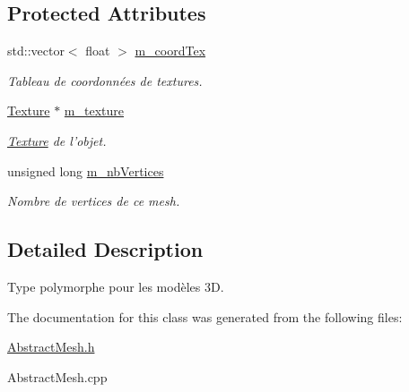 \subsection*{Protected Attributes}
\begin{DoxyCompactItemize}
\item 
\hypertarget{classAbstractMesh_a15e43124d601085e1495c738a657c826}{std\+::vector$<$ float $>$ \hyperlink{classAbstractMesh_a15e43124d601085e1495c738a657c826}{m\+\_\+coord\+Tex}}\label{classAbstractMesh_a15e43124d601085e1495c738a657c826}

\begin{DoxyCompactList}\small\item\em Tableau de coordonnées de textures. \end{DoxyCompactList}\item 
\hypertarget{classAbstractMesh_a0bcd16f81880e90b11781bb61af294cf}{\hyperlink{classTexture}{Texture} $\ast$ \hyperlink{classAbstractMesh_a0bcd16f81880e90b11781bb61af294cf}{m\+\_\+texture}}\label{classAbstractMesh_a0bcd16f81880e90b11781bb61af294cf}

\begin{DoxyCompactList}\small\item\em \hyperlink{classTexture}{Texture} de l'objet. \end{DoxyCompactList}\item 
\hypertarget{classAbstractMesh_a07951f17a49c5a02a895ca6cbdd3b0c5}{unsigned long \hyperlink{classAbstractMesh_a07951f17a49c5a02a895ca6cbdd3b0c5}{m\+\_\+nb\+Vertices}}\label{classAbstractMesh_a07951f17a49c5a02a895ca6cbdd3b0c5}

\begin{DoxyCompactList}\small\item\em Nombre de vertices de ce mesh. \end{DoxyCompactList}\end{DoxyCompactItemize}


\subsection{Detailed Description}
Type polymorphe pour les modèles 3\+D. 

The documentation for this class was generated from the following files\+:\begin{DoxyCompactItemize}
\item 
\hyperlink{AbstractMesh_8h}{Abstract\+Mesh.\+h}\item 
Abstract\+Mesh.\+cpp\end{DoxyCompactItemize}
